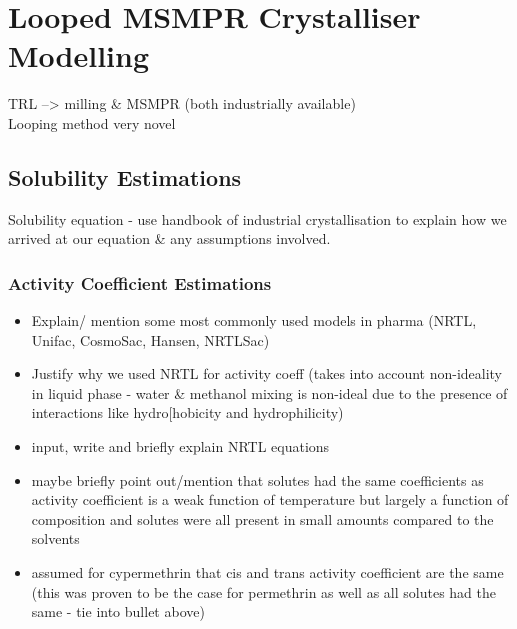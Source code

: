\section{Looped MSMPR Crystalliser Modelling}
\label{sec:sep_modelling}

TRL --> milling \& MSMPR (both industrially available)\\
Looping method very novel

\subsection{Solubility Estimations}
Solubility equation - use handbook of industrial crystallisation to explain how we arrived at our equation \& any assumptions involved.

\subsubsection{Activity Coefficient Estimations}
\begin{itemize}
    \item Explain/ mention some most commonly used models in pharma (NRTL, Unifac, CosmoSac, Hansen, NRTLSac)
    \item Justify why we used NRTL for activity coeff (takes into account non-ideality in liquid phase - water \& methanol mixing is non-ideal due to the presence of interactions like hydro[hobicity and hydrophilicity)
    \item input, write and briefly explain NRTL equations 
    \item maybe briefly point out/mention that solutes had the same coefficients as activity coefficient is a weak function of temperature but largely a function of composition and solutes were all present in small amounts compared to the solvents
    \item assumed for cypermethrin that cis and trans activity coefficient are the same (this was proven to be the case for permethrin as well as all solutes had the same - tie into bullet above)
\end{itemize}

